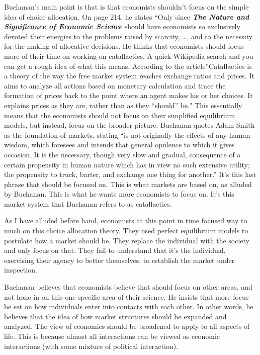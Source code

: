 \documentclass[11pt,]{article}
\begin{document}
Buchanan's main point is that is that economists shouldn't focus on the
simple idea of choice allocation. On page 214, he states ``Only since
\textbf{\emph{The Nature and Significance of Economic Science}}
\citet{buchanan1964} should have economists so exclusively devoted their
energies to the problems raised by scarcity, \ldots{}, and to the
necessity for the making of allocative decisions. He thinks that
economists should focus more of their time on working on catallactics. A
quick Wikipedia search and you can get a rough idea of what this means.
According to the article''Catallactics is a theory of the way the free
market system reaches exchange ratios and prices. It aims to analyze all
actions based on monetary calculation and trace the formation of prices
back to the point where an agent makes his or her choices. It explains
prices as they are, rather than as they ``should'' be." This essentially
means that the economists should not focus on their simplified
equilibrium models, but instead, focus on the broader picture. Buchanan
quotes Adam Smith as the foundation of markets, stating ``is not
originally the effects of any human wisdom, which foresees and intends
that general opulence to which it gives occasion. It is the necessary,
though very slow and gradual, consequence of a certain propensity in
human nature which has in view no such extensive utility; the propensity
to truck, barter, and exchange one thing for another.'' It's this last
phrase that should be focused on. This is what markets are based on, as
alluded by Buchanan. This is what he wants more economists to focus on.
It's this market system that Buchanan refers to as catallactics.

As I have alluded before hand, economists at this point in time focused
way to much on this choice allocation theory. They used perfect
equilibrium models to postulate how a market should be. They replace the
individual with the society and only focus on that. They fail to
understand that it's the individual, exercising their agency to better
themselves, to establish the market under inspection.

Buchanan believes that economists believe that should focus on other
areas, and not hone in on this one specific area of their science. He
insists that more focus be set on how individuals enter into contacts
with each other. In other words, he believes that the idea of how market
structures should be expanded and analyzed. The view of economics should
be broadened to apply to all aspects of life. This is because almost all
interactions can be viewed as economic interactions (with some mixture
of political interaction).
\end{document}
